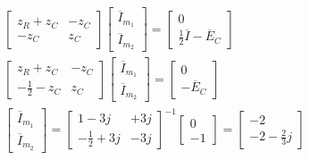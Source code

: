 \documentclass{article}
\begin{document}
\begin{gather*}
    \begin{bmatrix}
        z_R+z_C&-z_C\\-z_C&z_C
    \end{bmatrix}\begin{bmatrix}
        \overline{I}_{m_1}\\\overline{I}_{m_2}
    \end{bmatrix}=\begin{bmatrix}
        0\\\displaystyle\frac{1}{2}\overline{I}-\overline{E}_C
    \end{bmatrix}\\
    \begin{bmatrix}
        z_R+z_C&-z_C\\-\displaystyle\frac{1}{2}-z_C&z_C
    \end{bmatrix}\begin{bmatrix}
        \overline{I}_{m_1}\\\overline{I}_{m_2}
    \end{bmatrix}=\begin{bmatrix}
        0\\-\overline{E}_C
    \end{bmatrix}\\
    \begin{bmatrix}
        \overline{I}_{m_1}\\\overline{I}_{m_2}
    \end{bmatrix}=\begin{bmatrix}
        1-3j&+3j\\\displaystyle-\frac{1}{2}+3j&-3j
    \end{bmatrix}^{-1}\begin{bmatrix}
        0\\-1
    \end{bmatrix}=\begin{bmatrix}
        -2\\
        -2-\displaystyle\frac{2}{3}j
    \end{bmatrix}
\end{gather*}
\end{document}
